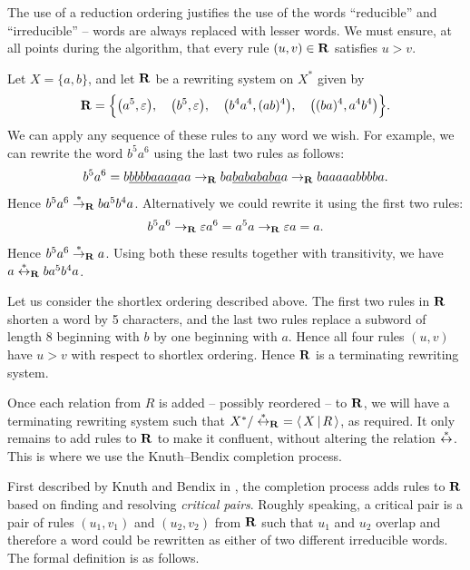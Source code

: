 The use of a reduction ordering justifies the use of the words ``reducible'' and
``irreducible'' -- words are always replaced with lesser words.  We must ensure,
at all points during the algorithm, that every rule $(u,v) \in \mathbf{R}$ satisfies
$u > v$.

\begin{example}
  \label{ex:rws}
  Let $X = \{a,b\}$, and let $\mathbf{R}$ be a rewriting system on $X^*$ given by
  $$\mathbf{R} = \Big\{
  \big(a^5, \varepsilon\big),\quad
  \big(b^5, \varepsilon\big),\quad
  \big(b^4a^4, (ab)^4\big),\quad
  \big((ba)^4, a^4b^4\big)
  \Big\}.$$
  We can apply any sequence of these rules to any word we wish.  For example, we
  can rewrite the word $b^5a^6$ using the last two rules as follows:
  $$b^5a^6
  = b\underline{bbbbaaaa}aa
  \to_{\mathbf{R}} ba\underline{babababa}a
  \to_{\mathbf{R}} baaaaabbbba.$$
  Hence $b^5a^6 \stackrel{*}{\to}_{\mathbf{R}} ba^5b^4a$.  Alternatively we could rewrite it using
  the first two rules:
  $$b^5a^6
  \to_{\mathbf{R}} \varepsilon a^6
  = a^5a
  \to_{\mathbf{R}} \varepsilon a
  = a.$$
  Hence $b^5a^6 \stackrel{*}{\to}_{\mathbf{R}} a$.  Using both these results together with
  transitivity, we have $a \stackrel{*}{\leftrightarrow}_{\mathbf{R}} ba^5b^4a$.
  
  Let us consider the shortlex ordering described above.  The first two rules in
  $\mathbf{R}$ shorten a word by 5 characters, and the last two rules replace a
  subword of length 8 beginning with $b$ by one beginning with $a$.  Hence all
  four rules $(u,v)$ have $u > v$ with respect to shortlex ordering.  Hence
  $\mathbf{R}$ is a terminating rewriting system.
\end{example}

Once each relation from $R$ is added -- possibly reordered -- to $\mathbf{R}$, we
will have a terminating rewriting system such that
$X^* / \stackrel{*}{\leftrightarrow}_{\mathbf{R}}\ = \left\langle\,X\,\middle|\,R\,\right\rangle$, as required.  It only remains to add
rules to $\mathbf{R}$ to make it confluent, without altering the relation
$\stackrel{*}{\leftrightarrow}$.  This is where we use the Knuth--Bendix completion process.

First described by Knuth and Bendix in \cite{knuth_bendix}, the completion
process adds rules to $\mathbf{R}$ based on finding and resolving
\textit{critical pairs}.  Roughly speaking, a critical pair is a pair of rules $(u_1, v_1)$ and
$(u_2, v_2)$ from $\mathbf{R}$ such that $u_1$ and $u_2$ overlap and therefore a word could be
rewritten as either of two different irreducible words.  The formal definition
is as follows.

